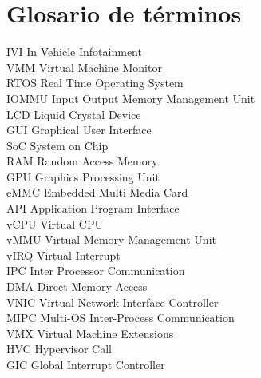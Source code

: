 \section{Glosario de términos}
IVI     In Vehicle Infotainment\\
VMM     Virtual Machine Monitor\\
RTOS    Real Time Operating System\\
IOMMU   Input Output Memory Management Unit\\
LCD     Liquid Crystal Device\\
GUI     Graphical User Interface\\
SoC     System on Chip\\
RAM     Random Access Memory\\
GPU     Graphics Processing Unit\\
eMMC    Embedded Multi Media Card\\
API     Application Program Interface\\
vCPU    Virtual CPU\\
vMMU    Virtual Memory Management Unit\\
vIRQ    Virtual Interrupt\\
IPC     Inter Processor Communication\\
DMA     Direct Memory Access\\
VNIC    Virtual Network Interface Controller\\
MIPC    Multi-OS Inter-Process Communication\\
VMX     Virtual Machine Extensions\\
HVC     Hypervisor Call\\
GIC     Global Interrupt Controller\\

\newpage
